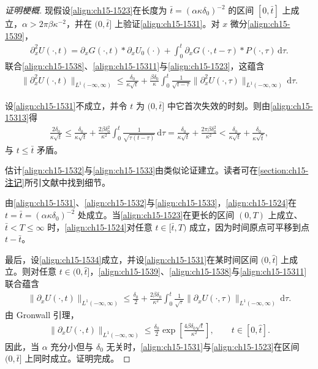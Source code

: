 \documentclass[../../main.tex]{subfiles}
\begin{document}
\begin{proof}[证明梗概]
现假设\eqref{align:ch15-1523}在长度为 $\bar t=(\alpha\kappa\delta_0)^{-2}$ 的区间 $[0,\bar t]$ 上成立，$\alpha>2\pi\beta\kappa^{-2}$，并在 $(0,\bar t]$ 上验证\eqref{align:ch15-1531}。对 $x$ 微分\eqref{align:ch15-1539}，
\begin{align}
\partial_x^2U(\cdot,t)=\partial_xG(\cdot,t)*\partial_xU_0(\cdot)+\int_0^t\partial_xG(\cdot,t-\tau)*P(\cdot,\tau)\,\mathrm{d}\tau.
\label{align:ch15-15312}
\end{align}
联合\eqref{align:ch15-1538}、\eqref{align:ch15-15311}与\eqref{align:ch15-1523}，这蕴含
\begin{align}
\|\partial_x^2U(\cdot,t)\|_{L^1(-\infty,\infty)}\leqslant\frac{\delta_0}{\kappa\sqrt{t}}+\frac{\beta\delta_0}{\kappa}\int_0^t\frac1{\sqrt{t-\tau}}\|\partial_x^2U(\cdot,\tau)\|_{L^1(-\infty,\infty)}\,\mathrm{d}\tau.
\label{align:ch15-15313}
\end{align}

设\eqref{align:ch15-1531}不成立，并令 $t$ 为 $(0,\bar t]$ 中它首次失效的时刻。则由\eqref{align:ch15-15313}得
\begin{align}
\frac{2\delta_0}{\kappa\sqrt{t}}\leqslant\frac{\delta_0}{\kappa\sqrt{t}}+\frac{2\beta\delta_0^2}{\kappa^2}\int_0^t\frac1{\sqrt{\tau(t-\tau)}}\,\mathrm{d}\tau=\frac{\delta_0}{\kappa\sqrt{t}}+\frac{2\pi\beta\delta_0^2}{\kappa^2}<\frac{\delta_0}{\kappa\sqrt{t}}+\frac{\delta_0}{\kappa\sqrt{\bar t}},
\label{align:ch15-15314}
\end{align}
与 $t\leqslant\bar t$ 矛盾。

估计\eqref{align:ch15-1532}与\eqref{align:ch15-1533}由类似论证建立。读者可在\cref{section:ch15-注记}所引文献中找到细节。

由\eqref{align:ch15-1531}、\eqref{align:ch15-1532}与\eqref{align:ch15-1533}，\eqref{align:ch15-1524}在 $t=\bar t=(\alpha\kappa\delta_0)^{-2}$ 处成立。当\eqref{align:ch15-1523}在更长的区间 $(0,T)$ 上成立、$\bar t<T\leqslant\infty$ 时，\eqref{align:ch15-1524}对任意 $t\in[\bar t,T)$ 成立，因为时间原点可平移到点 $t-\bar t$。

最后，设\eqref{align:ch15-1534}成立，并设\eqref{align:ch15-1531}在某时间区间 $(0,\hat t]$ 上成立。则对任意 $t\in(0,\hat t]$，\eqref{align:ch15-1539}、\eqref{align:ch15-1538}与\eqref{align:ch15-15311}联合蕴含
\begin{align}
\|\partial_xU(\cdot,t)\|_{L^1(-\infty,\infty)}\leqslant\frac{\delta_0}{2}+\frac{2\beta\delta_0}{\kappa^2}\int_0^t\frac1{\sqrt{\tau}}\|\partial_xU(\cdot,\tau)\|_{L^1(-\infty,\infty)}\,\mathrm{d}\tau.
\label{align:ch15-15315}
\end{align}
由 Gronwall 引理，
\begin{align}
\|\partial_xU(\cdot,t)\|_{L^1(-\infty,\infty)}\leqslant\frac{\delta_0}{2}\exp\left[\frac{4\beta\delta_0\sqrt{t}}{\kappa^2}\right],\qquad t\in[0,\hat t].
\label{align:ch15-15316}
\end{align}
因此，当 $\alpha$ 充分小但与 $\delta_0$ 无关时，\eqref{align:ch15-1531}与\eqref{align:ch15-1523}在区间 $(0,\bar t]$ 上同时成立。证明完成。
\end{proof}
\end{document}
